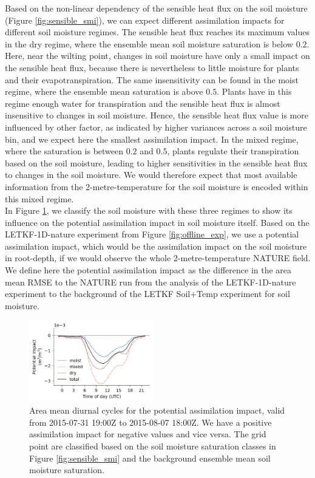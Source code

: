 \documentclass[HESSD, manuscript]{copernicus}
\begin{document}
Based on the non-linear dependency of the sensible heat flux on the soil moisture (Figure \ref{fig:sensible_smi}), we can expect different assimilation impacts for different soil moisture regimes.
The sensible heat flux reaches its maximum values in the dry regime, where the ensemble mean soil moisture saturation is below $0.2$.
Here, near the wilting point, changes in soil moisture have only a small impact on the sensible heat flux, because there is nevertheless to little moisture for plants and their evapotranspiration.
The same insensitivity can be found in the moist regime, where the ensemble mean saturation is above $0.5$.
Plants have in this regime enough water for transpiration and the sensible heat flux is almost insensitive to changes in soil moisture.
Hence, the sensible heat flux value is more influenced by other factor, as indicated by higher variances across a soil moisture bin, and we expect here the smallest assimilation impact.
In the mixed regime, where the saturation is between $0.2$ and $0.5$, plants regulate  their transpiration based on the soil moisture, leading to higher sensitivities in the sensible heat flux to changes in the soil moisture.
We would therefore expect that most available information from the 2-metre-temperature for the soil moisture is encoded within this mixed regime.\\

In Figure \ref{fig:h_impact}, we classify the soil moisture with these three regimes to show its influence on the potential assimilation impact in soil moisture itself.
Based on the LETKF-1D-nature experiment from Figure \ref{fig:offline_exp}, we use a potential assimilation impact, which would be the assimilation impact on the soil moisture in root-depth, if we would observe the whole 2-metre-temperature NATURE field.
We define here the potential assimilation impact as the difference in the area mean RMSE  to the NATURE run from the analysis of the LETKF-1D-nature experiment to the background of the LETKF Soil+Temp experiment for soil moisture.

\begin{figure}[ht]
	\includegraphics[width=0.48\textwidth]{figures/fig_09_soil_moisture_impact.png}
	\caption{
		Area mean diurnal cycles for the potential assimilation impact, valid from 2015-07-31 19:00Z to 2015-08-07 18:00Z.
		We have a positive assimilation impact for negative values and vice versa.
		The grid point are classified based on the soil moisture saturation classes in Figure \ref{fig:sensible_smi} and the background ensemble mean soil moisture saturation.
	}
	\label{fig:h_impact}
\end{figure}
\end{document}
